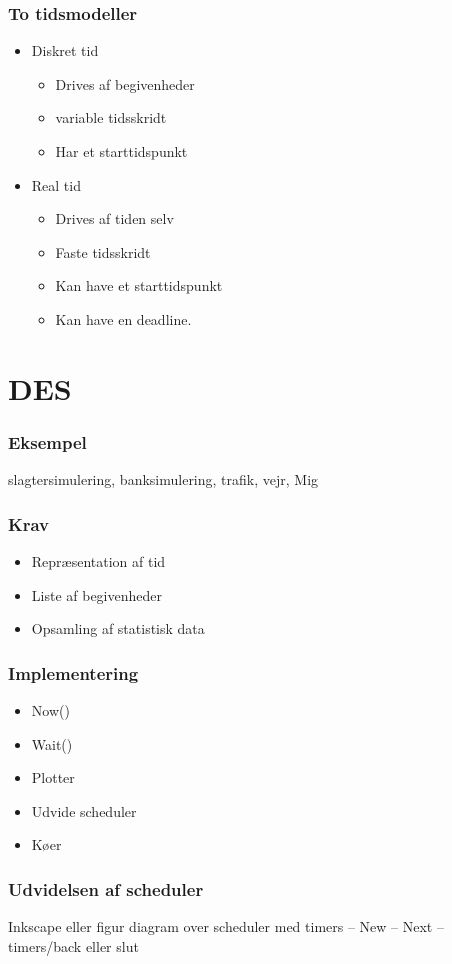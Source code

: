 \documentclass[12pt]{beamer}
\begin{document}
\begin{frame}
	\frametitle{To tidsmodeller}
	\begin{itemize}
		\item Diskret tid
		\begin{itemize}
			\item Drives af begivenheder
			\item variable tidsskridt
			\item Har et starttidspunkt
 		\end{itemize}
		\item Real tid
		\begin{itemize}
			\item Drives af tiden selv
			\item Faste tidsskridt
			\item Kan have et starttidspunkt
			\item Kan have en deadline.
		\end{itemize}
	\end{itemize}
\end{frame}

\section{DES}
\begin{frame}
  \frametitle{Eksempel}
slagtersimulering, banksimulering, trafik, vejr, Mig
\end{frame}

\begin{frame}
  \frametitle{Krav}
  \begin{itemize}   
	\item Repræsentation af tid
	\item Liste af begivenheder
	\item Opsamling af statistisk data
  \end{itemize}
\end{frame}

\begin{frame}
\frametitle{Implementering}
  \begin{itemize}   
	\item Now()
	\item Wait()
	\item Plotter
	\item Udvide scheduler
	\item Køer
  \end{itemize}
\end{frame}

\begin{frame}
\frametitle{Udvidelsen af scheduler}
  Inkscape eller figur diagram over scheduler med timers -- New -- Next --timers/back eller slut
\end{frame}
\end{document}
